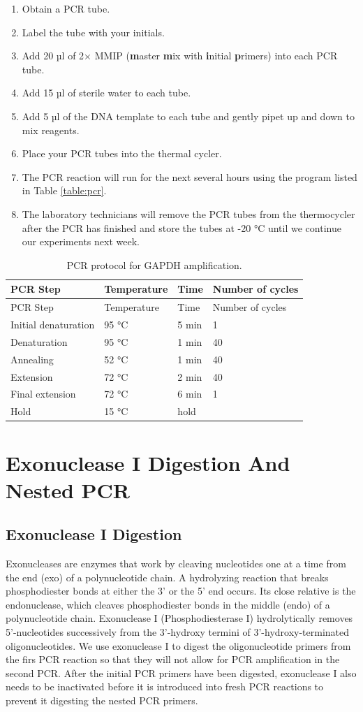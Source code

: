 \documentclass[]{book}
\providecommand{\tightlist}{%
  \setlength{\itemsep}{0pt}\setlength{\parskip}{0pt}}
\theoremstyle{definition}
\theoremstyle{definition}
\theoremstyle{definition}
\theoremstyle{remark}
\begin{document}
\begin{enumerate}
\def\labelenumi{\arabic{enumi}.}
\tightlist
\item
  Obtain a PCR tube.
\item
  Label the tube with your initials.
\item
  Add 20 µl of 2× MMIP (\textbf{m}aster \textbf{m}ix with
  \textbf{i}nitial \textbf{p}rimers) into each PCR tube.
\item
  Add 15 µl of sterile water to each tube.
\item
  Add 5 µl of the DNA template to each tube and gently pipet up and down
  to mix reagents.
\item
  Place your PCR tubes into the thermal cycler.
\item
  The PCR reaction will run for the next several hours using the program
  listed in Table \ref{table:pcr}.
\item
  The laboratory technicians will remove the PCR tubes from the
  thermocycler after the PCR has finished and store the tubes at -20 °C
  until we continue our experiments next week.
\end{enumerate}

\begin{longtable}[]{@{}llll@{}}
\caption{\label{tab:pcr} PCR protocol for GAPDH
amplification.}\tabularnewline
\toprule
PCR Step & Temperature & Time & Number of cycles\tabularnewline
\midrule
\endfirsthead
\toprule
PCR Step & Temperature & Time & Number of cycles\tabularnewline
\midrule
\endhead
Initial denaturation & 95 °C & 5 min & 1\tabularnewline
Denaturation & 95 °C & 1 min & 40\tabularnewline
Annealing & 52 °C & 1 min & 40\tabularnewline
Extension & 72 °C & 2 min & 40\tabularnewline
Final extension & 72 °C & 6 min & 1\tabularnewline
Hold & 15 °C & hold &\tabularnewline
\bottomrule
\end{longtable}

\chapter{Exonuclease I Digestion And Nested
PCR}\label{exonuclease-i-digestion-and-nested-pcr}

\section{Exonuclease I Digestion}\label{exonuclease-i-digestion}

Exonucleases are enzymes that work by cleaving nucleotides one at a time
from the end (exo) of a polynucleotide chain. A hydrolyzing reaction
that breaks phosphodiester bonds at either the 3' or the 5' end occurs.
Its close relative is the endonuclease, which cleaves phosphodiester
bonds in the middle (endo) of a polynucleotide chain. Exonuclease I
(Phosphodiesterase I) hydrolytically removes 5'-nucleotides successively
from the 3'-hydroxy termini of 3'-hydroxy-terminated oligonucleotides.
We use exonuclease I to digest the oligonucleotide primers from the firs
PCR reaction so that they will not allow for PCR amplification in the
second PCR. After the initial PCR primers have been digested,
exonuclease I also needs to be inactivated before it is introduced into
fresh PCR reactions to prevent it digesting the nested PCR primers.
\end{document}
